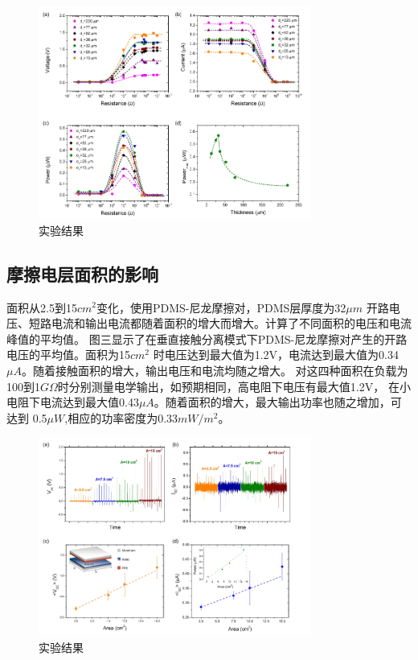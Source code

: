 \documentclass{ctexart}[UTF-8]        %
\begin{document}
\begin{figure}[!ht]\centering
    \includegraphics[width=0.80\textwidth]{Image/R-P.png}
    \caption{实验结果}
\end{figure}


\subsection{摩擦电层面积的影响}

面积从2.5到15$cm^2$变化，使用PDMS-尼龙摩擦对，PDMS层厚度为32$\mu m$
开路电压、短路电流和输出电流都随着面积的增大而增大。计算了不同面积的电压和电流峰值的平均值。
图三显示了在垂直接触分离模式下PDMS-尼龙摩擦对产生的开路电压的平均值。面积为15$cm^2$
时电压达到最大值为1.2V，电流达到最大值为0.34$\mu A$。随着接触面积的增大，输出电压和电流均随之增大。
对这四种面积在负载为100到1$G\Omega$时分别测量电学输出，如预期相同，高电阻下电压有最大值1.2V，
在小电阻下电流达到最大值0.43$\mu A$。随着面积的增大，最大输出功率也随之增加，可达到
0.5$\mu W$,相应的功率密度为0.33$mW/m^2$。


\begin{figure}[!ht]\centering
    \includegraphics[width=0.80\textwidth]{Image/V-S.png}
    \caption{实验结果}
\end{figure}
\end{document}
